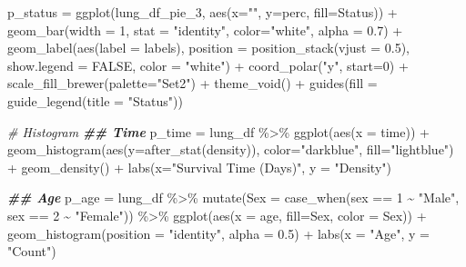 \documentclass[
]{article}
\newenvironment{Shaded}{\begin{snugshade}}{\end{snugshade}}
\newcommand{\AttributeTok}[1]{\textcolor[rgb]{0.77,0.63,0.00}{#1}}
\newcommand{\CommentTok}[1]{\textcolor[rgb]{0.56,0.35,0.01}{\textit{#1}}}
\newcommand{\ConstantTok}[1]{\textcolor[rgb]{0.00,0.00,0.00}{#1}}
\newcommand{\DecValTok}[1]{\textcolor[rgb]{0.00,0.00,0.81}{#1}}
\newcommand{\DocumentationTok}[1]{\textcolor[rgb]{0.56,0.35,0.01}{\textbf{\textit{#1}}}}
\newcommand{\FloatTok}[1]{\textcolor[rgb]{0.00,0.00,0.81}{#1}}
\newcommand{\FunctionTok}[1]{\textcolor[rgb]{0.00,0.00,0.00}{#1}}
\newcommand{\NormalTok}[1]{#1}
\newcommand{\OtherTok}[1]{\textcolor[rgb]{0.56,0.35,0.01}{#1}}
\newcommand{\SpecialCharTok}[1]{\textcolor[rgb]{0.00,0.00,0.00}{#1}}
\newcommand{\StringTok}[1]{\textcolor[rgb]{0.31,0.60,0.02}{#1}}
\begin{document}
\begin{Shaded}
\begin{Highlighting}[]
\NormalTok{p\_status }\OtherTok{=} 
  \FunctionTok{ggplot}\NormalTok{(lung\_df\_pie\_3, }\FunctionTok{aes}\NormalTok{(}\AttributeTok{x=}\StringTok{""}\NormalTok{, }\AttributeTok{y=}\NormalTok{perc, }\AttributeTok{fill=}\NormalTok{Status)) }\SpecialCharTok{+} 
  \FunctionTok{geom\_bar}\NormalTok{(}\AttributeTok{width =} \DecValTok{1}\NormalTok{, }\AttributeTok{stat =} \StringTok{"identity"}\NormalTok{, }\AttributeTok{color=}\StringTok{"white"}\NormalTok{, }\AttributeTok{alpha =} \FloatTok{0.7}\NormalTok{) }\SpecialCharTok{+} 
  \FunctionTok{geom\_label}\NormalTok{(}\FunctionTok{aes}\NormalTok{(}\AttributeTok{label =}\NormalTok{ labels),}
             \AttributeTok{position =} \FunctionTok{position\_stack}\NormalTok{(}\AttributeTok{vjust =} \FloatTok{0.5}\NormalTok{),}
             \AttributeTok{show.legend =} \ConstantTok{FALSE}\NormalTok{,}
             \AttributeTok{color =} \StringTok{"white"}\NormalTok{) }\SpecialCharTok{+}
  \FunctionTok{coord\_polar}\NormalTok{(}\StringTok{"y"}\NormalTok{, }\AttributeTok{start=}\DecValTok{0}\NormalTok{) }\SpecialCharTok{+}
  \FunctionTok{scale\_fill\_brewer}\NormalTok{(}\AttributeTok{palette=}\StringTok{"Set2"}\NormalTok{) }\SpecialCharTok{+}
  \FunctionTok{theme\_void}\NormalTok{() }\SpecialCharTok{+}
  \FunctionTok{guides}\NormalTok{(}\AttributeTok{fill =} \FunctionTok{guide\_legend}\NormalTok{(}\AttributeTok{title =} \StringTok{"Status"}\NormalTok{))}

\CommentTok{\# Histogram}
\DocumentationTok{\#\# Time}
\NormalTok{p\_time }\OtherTok{=} 
\NormalTok{  lung\_df }\SpecialCharTok{\%\textgreater{}\%}
  \FunctionTok{ggplot}\NormalTok{(}\FunctionTok{aes}\NormalTok{(}\AttributeTok{x =}\NormalTok{ time)) }\SpecialCharTok{+} 
  \FunctionTok{geom\_histogram}\NormalTok{(}\FunctionTok{aes}\NormalTok{(}\AttributeTok{y=}\FunctionTok{after\_stat}\NormalTok{(density)), }\AttributeTok{color=}\StringTok{"darkblue"}\NormalTok{, }\AttributeTok{fill=}\StringTok{"lightblue"}\NormalTok{) }\SpecialCharTok{+}
  \FunctionTok{geom\_density}\NormalTok{() }\SpecialCharTok{+}
  \FunctionTok{labs}\NormalTok{(}\AttributeTok{x=}\StringTok{"Survival Time (Days)"}\NormalTok{,}
       \AttributeTok{y =} \StringTok{"Density"}\NormalTok{)}

\DocumentationTok{\#\# Age}
\NormalTok{p\_age }\OtherTok{=} 
\NormalTok{  lung\_df }\SpecialCharTok{\%\textgreater{}\%}
  \FunctionTok{mutate}\NormalTok{(}\AttributeTok{Sex =} \FunctionTok{case\_when}\NormalTok{(sex }\SpecialCharTok{==} \DecValTok{1} \SpecialCharTok{\textasciitilde{}} \StringTok{"Male"}\NormalTok{,}
\NormalTok{                         sex }\SpecialCharTok{==} \DecValTok{2} \SpecialCharTok{\textasciitilde{}} \StringTok{"Female"}\NormalTok{)) }\SpecialCharTok{\%\textgreater{}\%}
  \FunctionTok{ggplot}\NormalTok{(}\FunctionTok{aes}\NormalTok{(}\AttributeTok{x =}\NormalTok{ age, }\AttributeTok{fill=}\NormalTok{Sex, }\AttributeTok{color =}\NormalTok{ Sex)) }\SpecialCharTok{+} 
  \FunctionTok{geom\_histogram}\NormalTok{(}\AttributeTok{position =} \StringTok{"identity"}\NormalTok{, }\AttributeTok{alpha =} \FloatTok{0.5}\NormalTok{) }\SpecialCharTok{+}
  \FunctionTok{labs}\NormalTok{(}\AttributeTok{x =} \StringTok{"Age"}\NormalTok{,}
       \AttributeTok{y =} \StringTok{"Count"}\NormalTok{)}


\end{Highlighting}
\end{Shaded}
\end{document}
